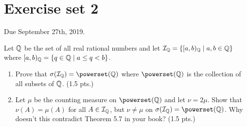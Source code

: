 \section{Exercise set 2}

Due September 27th, 2019.

\begin{ex}
	Let $\mathbb{Q}$ be the set of all real rational numbers and let $\mathcal{I}_{\mathbb{Q}} = \{[a, b)_{\mathbb{Q}} \mid a,b \in \mathbb{Q}\}$ where $[a,b)_{\mathbb{Q}} = \{q \in \mathbb{Q} \mid a \leq q < b\}$.
	\begin{enumerate}
		\item Prove that $\sigma(\calI_\Q) = \powerset(\Q)$ where $\powerset(\Q)$ is the collection of all subsets of $\mathbb{Q}$. (1.5 pts.)
		\item Let $\mu$ be the counting measure on $\powerset(\Q)$ and let $\nu = 2\mu$. Show that $\nu(A) = \mu(A)$ for all $A \in \mathcal{I}_{\mathbb{Q}}$, but $\nu \neq \mu$ on $\sigma(\calI_\Q) = \powerset(\Q)$. Why doesn't this contradict Theorem 5.7 in your book? (1.5 pts.)
	\end{enumerate}
\end{ex}


